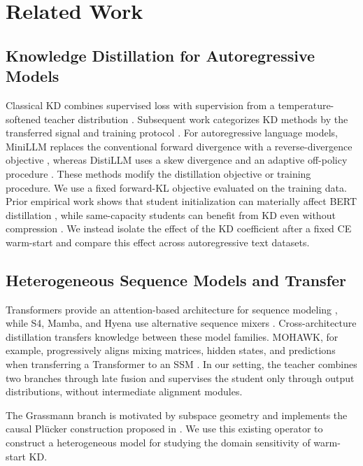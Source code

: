 \documentclass[conference]{IEEEtran}
\begin{document}
\section{Related Work}

\subsection{Knowledge Distillation for Autoregressive Models}

Classical KD combines supervised loss with supervision from a
temperature-softened teacher distribution \cite{hinton2015distilling}.
Subsequent work categorizes KD methods by the transferred signal and
training protocol
\cite{gou2021knowledge}.  For autoregressive language models, MiniLLM replaces
the conventional forward divergence with a reverse-divergence objective
\cite{gu2024minillm}, whereas DistiLLM uses a skew divergence and an
adaptive off-policy procedure \cite{ko2024distillm}.  These methods modify the
distillation objective or training procedure.  We use a fixed forward-KL
objective evaluated on the training data.  Prior empirical work shows that
student initialization can materially affect BERT distillation
\cite{wang2023distill}, while same-capacity students can benefit from KD even
without compression \cite{furlanello2018born}.  We instead isolate the effect
of the KD coefficient after a fixed CE warm-start and compare this effect
across autoregressive text datasets.

\subsection{Heterogeneous Sequence Models and Transfer}

Transformers provide an attention-based architecture for sequence modeling
\cite{vaswani2017attention}, while S4, Mamba, and Hyena use alternative
sequence mixers \cite{gu2022s4,gu2023mamba,poli2023hyena}.
Cross-architecture distillation transfers knowledge between these model
families.  MOHAWK, for example,
progressively aligns mixing matrices, hidden states, and predictions when
transferring a Transformer to an SSM \cite{bick2024transformers}.  In our
setting, the teacher combines two branches through late fusion and
supervises the student only through output distributions, without
intermediate alignment modules.

The Grassmann branch is motivated by subspace geometry
\cite{edelman1998grassmann,absil2008opt,bronstein2021geometric} and implements
the causal Pl\"ucker construction proposed in
\cite{zhang2025attentionnot}.  We use this existing operator to construct a
heterogeneous model for studying the domain sensitivity of warm-start KD.
\end{document}
